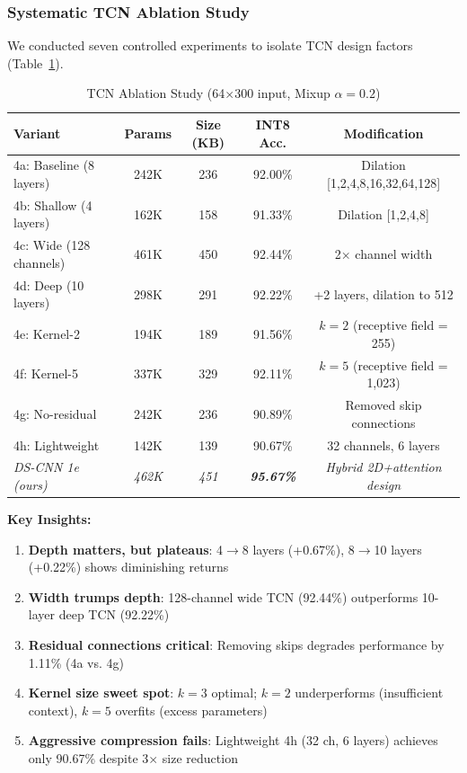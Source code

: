 \documentclass[10pt,a4paper,twoside]{article}
\begin{document}
\subsubsection{Systematic TCN Ablation Study}

We conducted seven controlled experiments to isolate TCN design factors (Table~\ref{tab:tcn_ablation}).

\begin{table}[h]
	\centering
	\caption{TCN Ablation Study (64$\times$300 input, Mixup $\alpha=0.2$)}
	\label{tab:tcn_ablation}
	\begin{tabular}{lcccc}
		\toprule
		\textbf{Variant} & \textbf{Params} & \textbf{Size (KB)} & \textbf{INT8 Acc.} & \textbf{Modification} \\
		\midrule
		4a: Baseline (8 layers) & 242K & 236 & 92.00\% & Dilation [1,2,4,8,16,32,64,128] \\
		4b: Shallow (4 layers) & 162K & 158 & 91.33\% & Dilation [1,2,4,8] \\
		4c: Wide (128 channels) & 461K & 450 & 92.44\% & 2$\times$ channel width \\
		4d: Deep (10 layers) & 298K & 291 & 92.22\% & +2 layers, dilation to 512 \\
		4e: Kernel-2 & 194K & 189 & 91.56\% & $k=2$ (receptive field = 255) \\
		4f: Kernel-5 & 337K & 329 & 92.11\% & $k=5$ (receptive field = 1,023) \\
		4g: No-residual & 242K & 236 & 90.89\% & Removed skip connections \\
		4h: Lightweight & 142K & 139 & 90.67\% & 32 channels, 6 layers \\
		\midrule
		\textit{DS-CNN 1e (ours)} & \textit{462K} & \textit{451} & \textit{\textbf{95.67\%}} & \textit{Hybrid 2D+attention design} \\
		\bottomrule
	\end{tabular}
\end{table}

\noindent\textbf{Key Insights:}
\begin{enumerate}
	\item \textbf{Depth matters, but plateaus}: 4$\to$8 layers (+0.67\%), 8$\to$10 layers (+0.22\%) shows diminishing returns
	\item \textbf{Width trumps depth}: 128-channel wide TCN (92.44\%) outperforms 10-layer deep TCN (92.22\%)
	\item \textbf{Residual connections critical}: Removing skips degrades performance by 1.11\% (4a vs. 4g)
	\item \textbf{Kernel size sweet spot}: $k=3$ optimal; $k=2$ underperforms (insufficient context), $k=5$ overfits (excess parameters)
	\item \textbf{Aggressive compression fails}: Lightweight 4h (32 ch, 6 layers) achieves only 90.67\% despite 3$\times$ size reduction
\end{enumerate}
\end{document}
